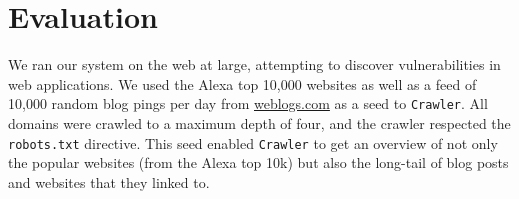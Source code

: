 
\section{Evaluation}

We ran our system on the web at large, attempting to discover \ehi
vulnerabilities in web applications. We used the Alexa top 10,000 websites as well as a feed of
10,000 random blog pings per day from \url{weblogs.com} as a seed to
\lstinline{Crawler}. All domains
were crawled to a maximum depth of four, and the crawler respected the
\lstinline{robots.txt} directive. This seed enabled \lstinline{Crawler} to
get an overview of not only the popular websites (from the Alexa top
10k) but also the long-tail of blog posts and websites that they
linked to.



%






